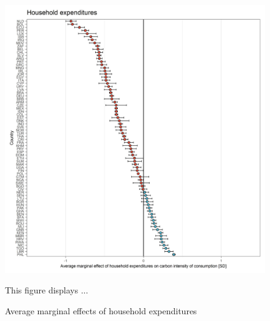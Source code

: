 \documentclass[12pt, a4paper]{article}
\newenvironment{subcaption}
{\strut
\vspace{-5pt}
\begin{minipage}[b]{0.9\textwidth}
  \hspace*{-\parindent}
  \footnotesize}
 {\end{minipage}}
\begin{document}
\begin{figure}[ht!]
  \centering
 \caption{Average marginal effects of household expenditures} \label{fig:E4_Expenditures}
  \includegraphics{Analysis_OLS_ME_Carbon_Intensity/AME_OLS_CI_log_hh_expenditures_USD_2014}
  \begin{subcaption}
    This figure displays ...
  \end{subcaption}

\end{figure}

\clearpage
\end{document}
